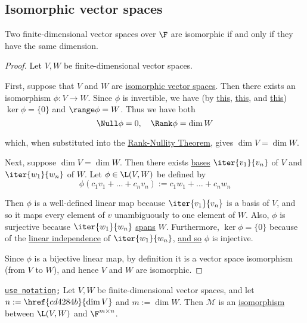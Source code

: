 \subsection{Isomorphic vector spaces}\label{ef39dd0}

\label{c10bb88}

Two finite-dimensional vector spaces over $\F$ are isomorphic if and only if
they have the same dimension.

\begin{proof}
  Let $V,W$ be finite-dimensional vector spaces.

  First, suppose that $V$ and $W$ are \href{d0ad6cb}{isomorphic vector spaces}.
  Then there exists an isomorphism $\phi:V\to W$. Since $\phi$ is invertible,
  we have (by \href{bd0d827}{this}, \href{f68db52}{this}, and
  \href{a41ddec}{this}) $\ker\phi=\{0\}$ and $\range\phi=W$. Thus we have both
  $$
    \Null\phi=0,\quad \Rank\phi=\dim W
  $$

  which, when substituted into the \href{e83dffc}{Rank-Nullity Theorem}, gives
  $\dim V=\dim W$.

  Next, suppose $\dim V=\dim W$. Then there exists \href{db2477b}{bases}
  $\iter{v_1}{v_n}$ of $V$ and $\iter{w_1}{w_n}$ of $W$. Let $\phi\in\L(V,W)$
  be defined by
  $$
    \phi(c_1v_1+\ldots+c_nv_n):=c_1w_1+\ldots+c_nw_n
  $$

  Then $\phi$ is a well-defined linear map because $\iter{v_1}{v_n}$ is a basis
  of $V$, and so it maps every element of $v$ unambiguously to one element of
  $W$. Also, $\phi$ is surjective because $\iter{w_1}{w_n}$
  \href{ac574be}{spans} $W$. Furthermore, $\ker\phi=\{0\}$ because of the
  \href{c133a44}{linear independence} of $\iter{w_1}{w_n}$, \href{f68db52}{and
  so} $\phi$ is injective.

  Since $\phi$ is a bijective linear map, by definition it is a vector space
  isomorphism (from $V$ to $W$), and hence $V$ and $W$ are isomorphic.
\end{proof}

\label{c172aff}

\texttt{\href{d76dfe6}{use notation};} Let $V,W$ be finite-dimensional vector
spaces, and let $n:=\href{cd4284b}{\dim V}$ and $m:=\dim W$. Then
\href{c70dad0}{$\mathcal M$} is an \href{d0ad6cb}{isomorphism} between $\L(V,W)$
and $\F^{m\times n}$.

